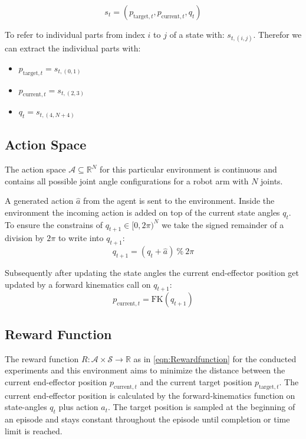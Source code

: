\begin{equation}\label{eqn:state}
    s_t = (p_{\text{target}, t}, p_{\text{current}, t}, q_t)
\end{equation}

To refer to individual parts from index $i$ to $j$ of a state with: $s_{t, (i, j)}$. Therefor we can extract the individual parts with:
\begin{itemize}
    \item $p_{\text{target}, t} = s_{t, (0, 1)}$ 
    \item $p_{\text{current}, t} = s_{t, (2, 3)}$
    \item $q_{t} = s_{t, (4, N + 4)}$
\end{itemize}

\subsection{Action Space}

The action space $\mathcal{A} \subseteq \mathbb{R}^N$ for this particular environment is continuous and contains all possible joint angle configurations for a robot arm with $N$ joints. 

A generated action $\hat{a}$ from the agent is sent to the environment. Inside the environment the incoming action is added on top of the current state angles $q_t$. To ensure the constrains of $q_{t+1} \in [0, 2\pi)^N$ we take the signed remainder of a division by $2\pi$ to write into $q_{t+1}$:
\begin{equation*}
    q_{t+1} = (q_t + \hat{a}) \ \% \ 2\pi
\end{equation*}

Subsequently after updating the state angles the current end-effector position get updated by a forward kinematics call on $q_{t+1}$:
\begin{equation*}
    p_{\text{current}, t} = \text{FK}(q_{t+1})
\end{equation*}


\subsection{Reward Function}

The reward function $R: \mathcal{A} \times \mathcal{S} \to \mathbb{R}$ as in \eqref{eqn:Rewardfunction} for the conducted experiments and this environment aims to minimize the distance between the current end-effector position $p_{\text{current}, t}$ and the current target position $p_{\text{target}, t}$. The current end-effector position is calculated by the forward-kinematics function on state-angles $q_t$ plus action $a_t$. The target position is sampled at the beginning of an episode and stays constant throughout the episode until completion or time limit is reached. 

